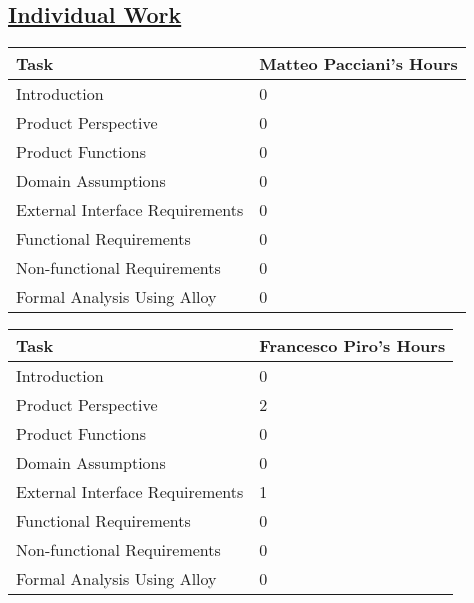 \subsection[Individual Work]{\hyperlink{toc}{Individual Work}}
\vspace{2mm}
\begin{center}
	\begin{tabular}{| l | p{} |}
	\hline
	\textbf{Task} & \textbf{Matteo Pacciani's Hours} \\ \hline
	Introduction & 0 \\ \hline
	Product Perspective & 0 \\ \hline
	Product Functions & 0 \\ \hline
	Domain Assumptions & 0 \\ \hline
	External Interface Requirements & 0 \\ \hline
	Functional Requirements & 0 \\ \hline
	Non-functional Requirements & 0 \\ \hline
	Formal Analysis Using Alloy & 0 \\
	\hline	
	\end{tabular}
	
	\vspace{2mm}
	
	\begin{tabular}{| l | p{} |}
	\hline
	\textbf{Task} & \textbf{Francesco Piro's Hours} \\ \hline
	Introduction & 0 \\ \hline
	Product Perspective & 2 \\ \hline
	Product Functions & 0 \\ \hline
	Domain Assumptions & 0 \\ \hline
	External Interface Requirements & 1 \\ \hline
	Functional Requirements & 0 \\ \hline
	Non-functional Requirements & 0 \\ \hline
	Formal Analysis Using Alloy & 0 \\
	\hline	
	\end{tabular}
\end{center}